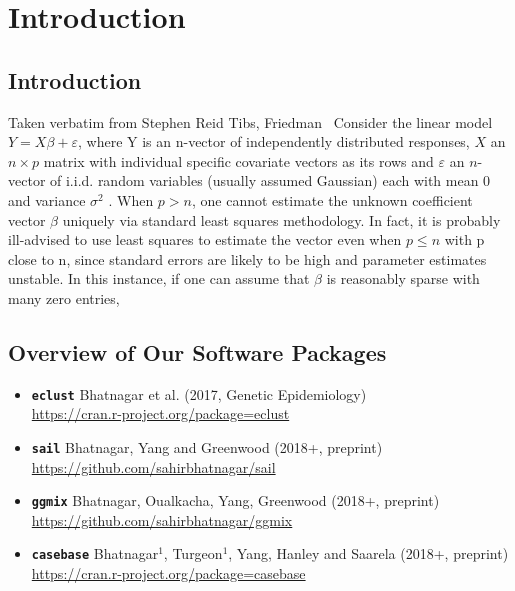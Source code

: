 \chapter{Introduction\label{ch:introduction}}

\section{Introduction}
Taken verbatim from Stephen Reid Tibs, Friedman~\cite{reid2016study}
Consider the linear model
$Y = X\beta + \varepsilon$,
where Y is an n-vector of independently distributed responses, $X$ an $n \times p$ matrix
with individual specific covariate vectors as its rows and $\varepsilon$ an $n$-vector of
i.i.d. random variables (usually assumed Gaussian) each with mean 0 and variance $\sigma^2$
.
When $p > n$, one cannot estimate the unknown coefficient vector $\beta$ uniquely
via standard least squares methodology. In fact, it is probably ill-advised to use
least squares to estimate the vector even when $p \leq n$ with p close to n, since
standard errors are likely to be high and parameter estimates unstable. In this
instance, if one can assume that $\beta$ is reasonably sparse with many zero entries,


\section{Overview of Our Software Packages}
	
\begin{itemize}
	\item \textbf{\footnotesize{}\texttt{eclust}}{\footnotesize{} \textendash{} Bhatnagar et al. (2017, Genetic Epidemiology)}\\
		{\footnotesize{}\url{https://cran.r-project.org/package=eclust}}{\footnotesize \par}
		\item \textbf{\footnotesize{}\texttt{sail}}{\footnotesize{} \textendash{} Bhatnagar, Yang and Greenwood
			(2018+, preprint)}\\
		{\footnotesize{}\url{https://github.com/sahirbhatnagar/sail}}{\footnotesize \par}
		\item \textbf{\footnotesize{}\texttt{ggmix}}{\footnotesize{} \textendash{} Bhatnagar, Oualkacha, Yang, Greenwood (2018+, preprint)}\\
		{\footnotesize{}\url{https://github.com/sahirbhatnagar/ggmix}}{\footnotesize \par}
		\item \textbf{\footnotesize{}\texttt{casebase}}{\footnotesize{} \textendash{} Bhatnagar$^1$, Turgeon$^1$, Yang, Hanley and Saarela (2018+, preprint)}\\
		{\footnotesize{}\url{https://cran.r-project.org/package=casebase}}{\footnotesize \par}
\end{itemize}
	
